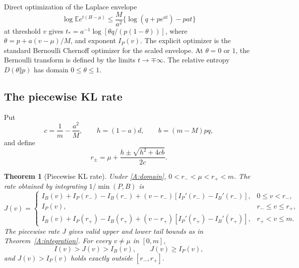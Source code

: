 \documentclass[11pt,a4paper]{article}
\newtheorem{theorem}{Theorem}[section]
\newcommand{\E}{\mathbb E}\newcommand{\R}{\mathbb R}\newcommand{\N}{\mathbb N}\newcommand{\one}{\mathbf1}
\begin{document}
Direct optimization of the Laplace envelope
\[
 \log\E e^{t(H-\mu)}\le
 \frac M{a^2}\{\log(q+pe^{at})-pat\}
\]
at threshold $v$ gives
$t_*=a^{-1}\log[\theta q/(p(1-\theta))]$,
where $\theta=p+a(v-\mu)/M$, and exponent $I_P(v)$.
The explicit optimizer is the standard Bernoulli Chernoff optimizer for the scaled envelope. At $\theta=0$ or $1$, the Bernoulli transform is defined by the limits $t\to\mp\infty$. The relative entropy $D(\theta\Vert p)$ has domain $0\le\theta\le1$.

\subsection{The piecewise KL rate}
Put
\[
 c=\frac1m-\frac{a^2}{M},\qquad
 h=(1-a)d,\qquad b=(m-M)pq,
\]
and define
\begin{equation}\label{A:switch}
 r_\pm=\mu+\frac{h\pm\sqrt{h^2+4cb}}{2c}.
\end{equation}
\begin{theorem}[Piecewise KL rate]\label{A:piecewise}
Under \eqref{A:domain}, $0<r_-<\mu<r_+<m$. The rate obtained by integrating
$1/\min(P,B)$ is
\begin{equation}\label{A:J}
 J(v)=
 \begin{cases}
 I_B(v)+I_P(r_-)-I_B(r_-)
 +(v-r_-)[I_P'(r_-)-I_B'(r_-)],&0\le v<r_-,\\
 I_P(v),&r_-\le v\le r_+,\\
 I_B(v)+I_P(r_+)-I_B(r_+)
 +(v-r_+)[I_P'(r_+)-I_B'(r_+)],&r_+<v\le m.
 \end{cases}
\end{equation}
The piecewise rate $J$ gives valid upper and lower tail bounds as in Theorem~\ref{A:integration}.
For every $v\ne\mu$ in $[0,m]$,
\begin{equation}\label{A:strict}
 I(v)>J(v)>I_B(v),\qquad J(v)\ge I_P(v),
\end{equation}
and $J(v)>I_P(v)$ holds exactly outside $[r_-,r_+]$.
\end{theorem}
\end{document}
